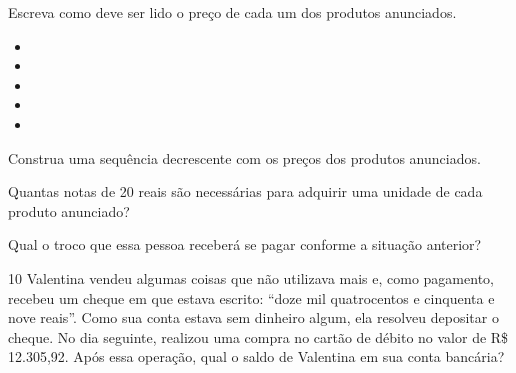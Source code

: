 \begin{escolha}
\item
  Escreva como deve ser lido o preço de cada um dos produtos anunciados.

\begin{itemize}  
\item{}

\item{}

\item {}

\item {}

\item {}
\end{itemize}

\item
  Construa uma sequência decrescente com os preços dos produtos anunciados.\\

\item
  Quantas notas de 20 reais são necessárias para adquirir uma unidade de
  cada produto anunciado?\\

\item
  Qual o troco que essa pessoa receberá se pagar conforme a situação anterior?\\ 
\end{escolha}

\num{10} Valentina vendeu algumas coisas que não utilizava mais e, como
pagamento, recebeu um cheque em que estava escrito: “doze mil quatrocentos
e cinquenta e nove reais”. Como sua conta estava sem dinheiro algum, ela
resolveu depositar o cheque. No dia seguinte, realizou uma compra no cartão de débito no valor de R\$ 12.305,92. Após essa operação, qual o
saldo de Valentina em sua conta bancária?

\begin{mdframed}[linewidth=2pt,linecolor=salmao]
\mbox{}\vspace*{6cm}
\end{mdframed}


